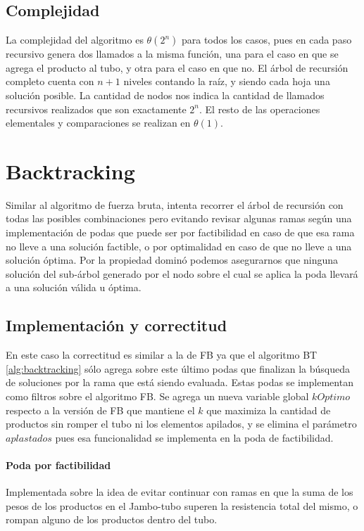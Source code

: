 \documentclass[10pt,a4paper]{article}
\begin{document}
\subsection{Complejidad}
La complejidad del algoritmo es $\theta(2^n)$ para todos los casos, pues en cada paso recursivo genera dos llamados a la misma función, una para el caso en que se agrega el producto al tubo, y otra para el caso en que no. El árbol de recursión completo cuenta con $n+1$ niveles contando la raíz, y siendo cada hoja una solución posible. La cantidad de nodos nos indica la cantidad de llamados recursivos realizados que son exactamente $2^n$.
El resto de las operaciones elementales y comparaciones se realizan en $\theta(1)$.

\section{Backtracking} \label{sec:backtracking}
Similar al algoritmo de fuerza bruta, intenta recorrer el árbol de recursión con todas las posibles combinaciones pero evitando revisar algunas ramas según una implementación de podas que puede ser por factibilidad en caso de que esa rama no lleve a una solución factible, o por optimalidad en caso de que no lleve a una solución óptima. Por la propiedad dominó podemos asegurarnos que ninguna solución del sub-árbol generado por el nodo sobre el cual se aplica la poda llevará a una solución válida u óptima.

\subsection{Implementación y correctitud}
En este caso la correctitud es similar a la de FB ya que el algoritmo BT \ref{alg:backtracking} sólo agrega sobre este último podas que finalizan la búsqueda de soluciones por la rama que está siendo evaluada. Estas podas se implementan como filtros sobre el algoritmo FB. Se agrega un nueva variable global $kOptimo$ respecto a la versión de FB que mantiene el $k$ que maximiza la cantidad de productos sin romper el tubo ni los elementos apilados, y se elimina el parámetro $aplastados$ pues esa funcionalidad se implementa en la poda de factibilidad.

\paragraph{Poda por factibilidad}
Implementada sobre la idea de evitar continuar con ramas en que la suma de los pesos de los productos en el Jambo-tubo superen la resistencia total del mismo, o rompan alguno de los productos dentro del tubo.
\end{document}
